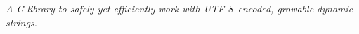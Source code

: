\label{index_md_README}%
%
 {\itshape A C library to safely yet efficiently work with UTF-\/8–encoded, growable dynamic strings.} 